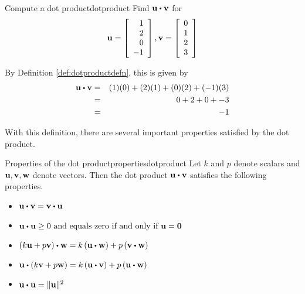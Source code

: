 \begin{example}{Compute a dot product}{dotproduct}
Find $\vect{u} \dotprod \vect{v}$ for
\begin{equation*}
{\bf u}
=
\left[ 
\begin{array}{r}
1 \\
2 \\
0 \\
-1 
\end{array}
\right],
{\bf v}
=
\left[ 
\begin{array}{r}
0 \\
1 \\
2 \\
3
\end{array}
\right] 
\end{equation*}
\end{example}

\begin{solution}
By Definition \ref{def:dotproductdefn}, this is given by 
\begin{eqnarray*}
\vect{u} \dotprod \vect{v}
&=&
(1)(0) + (2)(1) + (0)(2) + (-1)(3) \\
&=&
0 + 2 + 0 + -3 \\
&=&
-1
\end{eqnarray*}
\end{solution}

With this definition, there are several important properties satisfied
by the dot product.

\begin{proposition}{Properties of the dot product}{propertiesdotproduct}
Let $k $ and $p $  denote scalars and ${\bf u},{\bf v},{\bf w}$ denote vectors.
Then the dot product $\vect{u} \dotprod \vect{v}$ satisfies the following properties.
\begin{itemize}
\item
$\vect{u}\dotprod \vect{v}= \vect{v}\dotprod \vect{u} $
\item
$\vect{u}\dotprod \vect{u}\geq 0 \text{ and equals zero if and only if }\vect{u}=\vect{0}$
\item
$\left( k\vect{u}+p\vect{v}\right) \dotprod \vect{w}=k\left( \vect{u}\dotprod \vect{w}\right) +p\left( \vect{v}\dotprod \vect{w}\right)$
\item
$\vect{u}\dotprod\left( k\vect{v}+p\vect{w}\right) =k\left(
\vect{u}\dotprod \vect{v}\right) +p\left( \vect{u}\dotprod \vect{w}\right)$
\item
$\vect{u}\dotprod \vect{u}=\vectlength \vect{u}\vectlength ^{2} $
\end{itemize}
\end{proposition}

